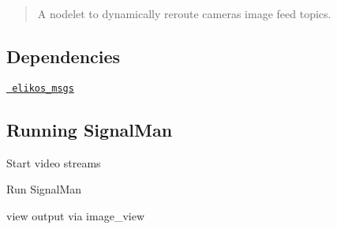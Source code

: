 \begin{quote}
A nodelet to dynamically reroute cameras image feed topics. \end{quote}


\subsection*{Dependencies}


\begin{DoxyItemize}
\item \href{https://github.com/elikos/elikos_msgs}{\texttt{ elikos\+\_\+msgs}}
\end{DoxyItemize}

\subsection*{Running Signal\+Man}

Start video streams 
\begin{DoxyCode}{0}
\end{DoxyCode}
 Run Signal\+Man 
\begin{DoxyCode}{0}
\end{DoxyCode}
 view output via image\+\_\+view 
\begin{DoxyCode}{0}
\end{DoxyCode}
 